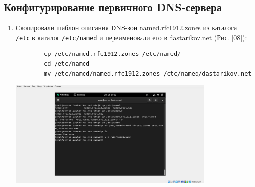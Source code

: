 \subsection{Конфигурирование первичного DNS-сервера}
\begin{enumerate}
     \item Скопировали шаблон описания DNS-зон named.rfc1912.zones из каталога {\tt /etc} в каталог {\tt /etc/named} и переименовали его в dastarikov.net (Рис. \ref{08}):
        \begin{verbatim}
        cp /etc/named.rfc1912.zones /etc/named/
        cd /etc/named
        mv /etc/named/named.rfc1912.zones /etc/named/dastarikov.net
        \end{verbatim}

\begin{center}
    \centering
    \includegraphics[width=0.8\textwidth]{../images/image08.png}
    \label{08}
\end{center}


\end{enumerate}
